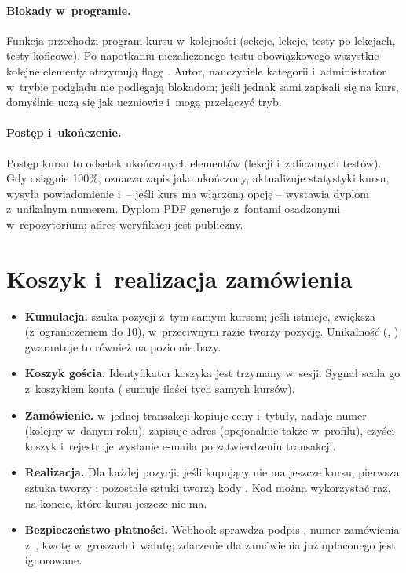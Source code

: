 \paragraph{Blokady w~programie.} Funkcja  przechodzi program kursu
w~kolejności (sekcje, lekcje, testy po lekcjach, testy końcowe). Po napotkaniu
niezaliczonego testu obowiązkowego wszystkie kolejne elementy otrzymują flagę
. Autor, nauczyciele kategorii i~administrator w~trybie podglądu nie podlegają
blokadom; jeśli jednak sami zapisali się na kurs, domyślnie uczą się jak uczniowie
i~mogą przełączyć tryb.

\paragraph{Postęp i~ukończenie.} Postęp kursu to odsetek ukończonych elementów (lekcji
i~zaliczonych testów). Gdy osiągnie 100\%,  oznacza zapis
jako ukończony, aktualizuje statystyki kursu, wysyła powiadomienie i~-- jeśli kurs ma
włączoną opcję -- wystawia dyplom z~unikalnym numerem. Dyplom PDF generuje
 z~fontami osadzonymi w~repozytorium; adres weryfikacji
 jest publiczny.

\section{Koszyk i~realizacja zamówienia}

\begin{itemize}
  \item \textbf{Kumulacja.}  szuka pozycji z~tym samym kursem; jeśli
        istnieje, zwiększa  (z~ograniczeniem do 10), w~przeciwnym razie
        tworzy pozycję. Unikalność (, ) gwarantuje to również na
        poziomie bazy.
  \item \textbf{Koszyk gościa.} Identyfikator koszyka jest trzymany w~sesji. Sygnał
         scala go z~koszykiem konta ( sumuje
        ilości tych samych kursów).
  \item \textbf{Zamówienie.}  w~jednej transakcji kopiuje ceny
        i~tytuły, nadaje numer  (kolejny w~danym roku), zapisuje
        adres (opcjonalnie także w~profilu), czyści koszyk i~rejestruje wysłanie e-maila po
        zatwierdzeniu transakcji.
  \item \textbf{Realizacja.} Dla każdej pozycji: jeśli kupujący nie ma jeszcze kursu,
        pierwsza sztuka tworzy ; pozostałe sztuki tworzą kody
        . Kod można wykorzystać raz, na koncie, które kursu jeszcze nie ma.
  \item \textbf{Bezpieczeństwo płatności.} Webhook sprawdza podpis
        , numer zamówienia z~, kwotę w~groszach
        i~walutę; zdarzenie dla zamówienia już opłaconego jest ignorowane.
\end{itemize}

